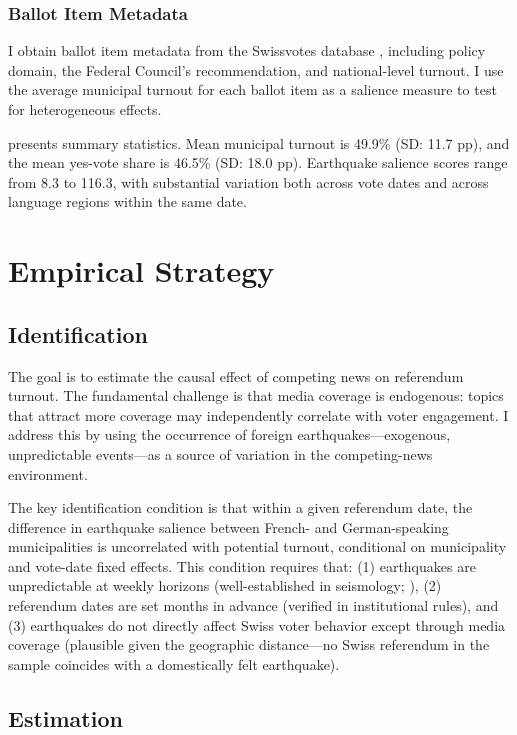 \documentclass[12pt]{article}
\begin{document}
\subsubsection*{Ballot Item Metadata} I obtain ballot item metadata from the Swissvotes database \citep{swissvotes}, including policy domain, the Federal Council's recommendation, and national-level turnout. I use the average municipal turnout for each ballot item as a salience measure to test for heterogeneous effects.

 presents summary statistics. Mean municipal turnout is 49.9\% (SD: 11.7 pp), and the mean yes-vote share is 46.5\% (SD: 18.0 pp). Earthquake salience scores range from 8.3 to 116.3, with substantial variation both across vote dates and across language regions within the same date.



\section{Empirical Strategy}

\subsection{Identification}

The goal is to estimate the causal effect of competing news on referendum turnout. The fundamental challenge is that media coverage is endogenous: topics that attract more coverage may independently correlate with voter engagement. I address this by using the occurrence of foreign earthquakes---exogenous, unpredictable events---as a source of variation in the competing-news environment.

The key identification condition is that within a given referendum date, the difference in earthquake salience between French- and German-speaking municipalities is uncorrelated with potential turnout, conditional on municipality and vote-date fixed effects. This condition requires that: (1) earthquakes are unpredictable at weekly horizons (well-established in seismology; \citealp{geller1997earthquakes}), (2) referendum dates are set months in advance (verified in institutional rules), and (3) earthquakes do not directly affect Swiss voter behavior except through media coverage (plausible given the geographic distance---no Swiss referendum in the sample coincides with a domestically felt earthquake).

\subsection{Estimation}
\end{document}
